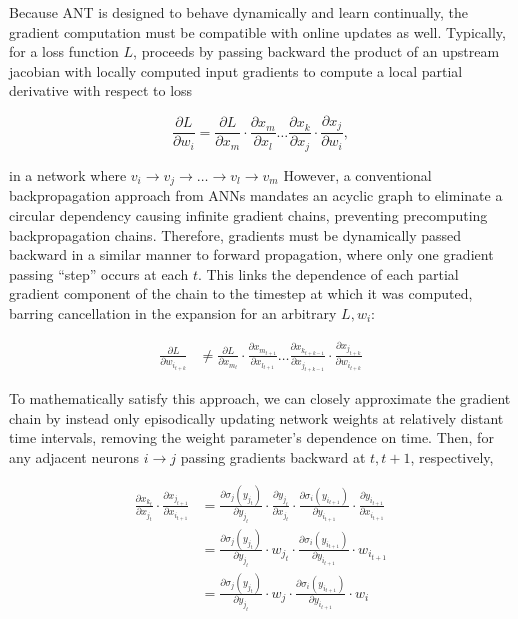 \documentclass{article}
\begin{document}
\begin{multicols}{2}
	Because ANT is designed to behave dynamically and learn continually, the gradient computation must be compatible with online updates as well. Typically, for a loss function $L$, proceeds by passing backward the product of an upstream jacobian with locally computed input gradients to compute a local partial derivative with respect to loss
	
	$$\frac{\partial L}{\partial w_i} = \frac{\partial L}{\partial x_m} \cdot \frac{\partial x_m}{\partial x_l} \dots \frac{\partial x_k}{\partial x_j} \cdot \frac{\partial x_j}{\partial w_i},$$
	
	 in a network where $v_i \rightarrow v_j \rightarrow \dots \rightarrow v_l \rightarrow v_m$ However, a conventional backpropagation approach from ANNs mandates an acyclic graph to eliminate a circular dependency causing infinite gradient chains, preventing precomputing backpropagation chains. Therefore, gradients must be dynamically passed backward in a similar manner to forward propagation, where only one gradient passing ``step'' occurs at each $t$. This links the dependence of each partial gradient component of the chain to the timestep at which it was computed, barring cancellation in the expansion for an arbitrary $L, w_i$:
	 
	 \begin{equation*}
	 	\begin{split}
	 		\frac{\partial L}{\partial w_{i_{t + k}}} & \neq \frac{\partial L}{\partial x_{m_t}} \cdot \frac{\partial x_{m_{t + 1}}}{\partial x_{l_{t + 1}}} \dots \frac{\partial x_{k_{t + k - 1}}}{\partial x_{j_{t + k - 1}}} \cdot \frac{\partial x_{j_{t + k}}}{\partial w_{i_{t + k}}}
	 	\end{split}
	 \end{equation*}
	 
	 To mathematically satisfy this approach, we can closely approximate the gradient chain by instead only episodically updating network weights at relatively distant time intervals, removing the weight parameter's dependence on time. Then, for any adjacent neurons $i \rightarrow j$ passing gradients backward at $t, t + 1$, respectively,
	 
	 \begin{equation*}
	 	\begin{split}
	 		\frac{\partial x_{k_t}}{\partial x_{j_t}} \cdot \frac{\partial x_{j_{t + 1}}}{\partial x_{i_{t + 1}}} & = \frac{\partial \sigma_j(y_{j_{t}})}{\partial y_{j_{t}}} \cdot \frac{\partial y_{j_{t}}}{ \partial x_{j_{t}}} \cdot \frac{\partial \sigma_i(y_{i_{t + 1}})}{\partial y_{i_{t + 1}}} \cdot \frac{\partial y_{i_{t + 1}}}{ \partial x_{i_{t+1}}} \\
	 		& = \frac{\partial \sigma_j(y_{j_{t}})}{\partial y_{j_{t}}} \cdot w_{j_{t}} \cdot \frac{\partial \sigma_i(y_{i_{t + 1}})}{\partial y_{i_{t + 1}}} \cdot w_{i_{t + 1}} \\
	 		& = \frac{\partial \sigma_j(y_{j_{t}})}{\partial y_{j_{t}}} \cdot w_{j} \cdot \frac{\partial \sigma_i(y_{i_{t + 1}})}{\partial y_{i_{t + 1}}} \cdot w_{i}
	 	\end{split}
	 \end{equation*}
	 

\end{multicols}
\end{document}
